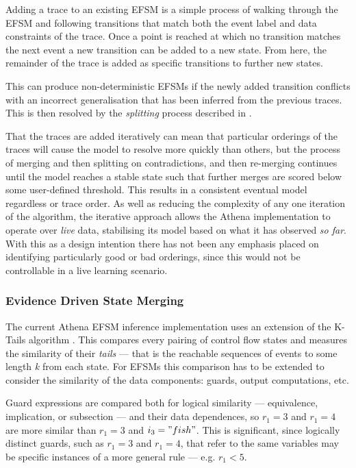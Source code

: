 Adding a trace to an existing EFSM is a simple process of walking through the EFSM and following transitions that match both the event label and data constraints of the trace. Once a point is reached at which no transition matches the next event a new transition can be added to a new state. From here, the remainder of the trace is added as specific transitions to further new states. 

This can produce non-deterministic EFSMs if the newly added transition conflicts with an incorrect generalisation that has been inferred from the previous traces. This is then resolved by the \emph{splitting} process described in .

That the traces are added iteratively can mean that particular orderings of the traces will cause the model to resolve more quickly than others, but the process of merging and then splitting on contradictions, and then re-merging continues until the model reaches a stable state such that further merges are scored below some user-defined threshold. This results in a consistent eventual model regardless or trace order. As well as reducing the complexity of any one iteration of the algorithm, the iterative approach allows the Athena implementation to operate over \emph{live} data, stabilising its model based on what it has observed \emph{so far}. With this as a design intention there has not been any emphasis placed on identifying particularly good or bad orderings, since this would not be controllable in a live learning scenario. 

\subsubsection{Evidence Driven State Merging}
\label{EDSM}

The current Athena EFSM inference implementation uses an extension of the K-Tails algorithm \cite{}. This compares every pairing of control flow states and measures the similarity of their \emph{tails} --- that is the reachable sequences of events to some length \emph{k} from each state. For EFSMs this comparison has to be extended to consider the similarity of the data components: guards, output computations, etc. 

Guard expressions are compared both for logical similarity --- equivalence, implication, or subsection --- and their data dependences, so $r_1 = 3$ and $r_1 = 4$ are more similar than $r_1 = 3$ and $i_3 = "fish"$. This is significant, since logically distinct guards, such as $r_1 = 3$ and $r_1 = 4$, that refer to the same variables may be specific instances of a more general rule --- e.g. $r_1 < 5$.

